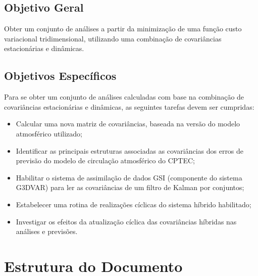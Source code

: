 \subsection{Objetivo Geral}
\label{obj_geral}

Obter um conjunto de análises a partir da minimização de uma função custo variacional tridimensional, utilizando uma combinação de covariâncias estacionárias e dinâmicas.

\subsection{Objetivos Específicos}
\label{obj_espec}

Para se obter um conjunto de análises calculadas com base na combinação de covariâncias estacionárias e dinâmicas, as seguintes tarefas devem ser cumpridas:

\begin{itemize}
    \item Calcular uma nova matriz de covariâncias, baseada na versão do modelo atmosférico utilizado;
    \item Identificar as principais estruturas associadas as covariâncias dos erros de previsão do modelo de circulação atmosférico do CPTEC;
    \item Habilitar o sistema de assimilação de dados GSI (componente do sistema G3DVAR) para ler as covariâncias de um filtro de Kalman por conjuntos;
    \item Estabelecer uma rotina de realizações cíclicas do sistema híbrido habilitado;
    \item Investigar os efeitos da atualização cíclica das covariâncias híbridas nas análises e previsões.
\end{itemize}

\section{Estrutura do Documento}
\label{sec:estrutura_doc}

